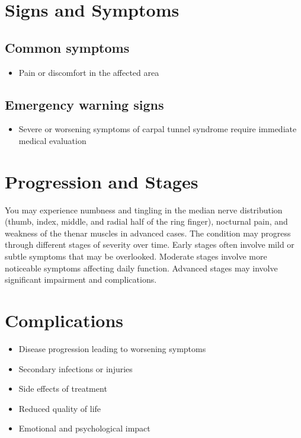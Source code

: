 \section{Signs and Symptoms}

\subsection{Common symptoms}
\begin{itemize}[noitemsep]
  \item Pain or discomfort in the affected area
  \end{itemize}

\subsection{Emergency warning signs}
\begin{itemize}[noitemsep]
  \item Severe or worsening symptoms of carpal tunnel syndrome require immediate medical evaluation
\end{itemize}
\section{Progression and Stages}
You may experience numbness and tingling in the median nerve distribution (thumb, index, middle, and radial half of the ring finger), nocturnal pain, and weakness of the thenar muscles in advanced cases. The condition may progress through different stages of severity over time. Early stages often involve mild or subtle symptoms that may be overlooked. Moderate stages involve more noticeable symptoms affecting daily function. Advanced stages may involve significant impairment and complications.
\section{Complications}
\begin{itemize}[noitemsep]
  \item Disease progression leading to worsening symptoms
  \item Secondary infections or injuries
  \item Side effects of treatment
  \item Reduced quality of life
  \item Emotional and psychological impact
\end{itemize}
